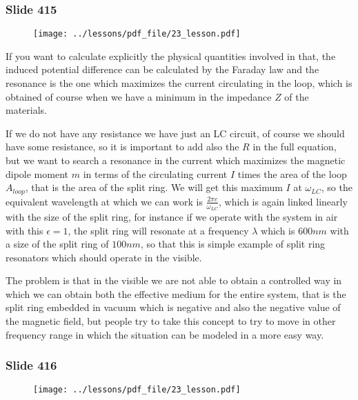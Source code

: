 \documentclass[../main/main.tex]{subfiles}
\begin{document}
\newpage

\subsubsection{Slide 415}

\begin{figure}[h!]
\centering
\texttt{[image: ../lessons/pdf\_file/23\_lesson.pdf]}
\end{figure}

If you want to calculate explicitly the physical quantities involved in that, the induced potential difference can be calculated by the Faraday law and the resonance is the one which maximizes the current circulating in the loop, which is obtained of course when we have a minimum in the impedance $Z$ of the materials.

If we do not have any resistance we have just an LC circuit, of course we should have some resistance, so it is important to add also the $R$ in the full equation, but we want to search a resonance in the current which maximizes the magnetic dipole moment $m$ in terms of the circulating current $I$ times the area of the loop $A_{loop}$, that is the area of the split ring. 
We will get this maximum $I$ at $\omega_{LC}$, so the equivalent wavelength at which we can work is $\frac{2 \pi c}{\omega_{LC}}$, which is again linked linearly with the size of the split ring, for instance if we operate with the system in air with this $\epsilon = 1$, the split ring will resonate at a frequency $\lambda$ which is $600 nm$ with a size of the split ring of $100 nm$, so that this is simple example of split ring resonators which should operate in the visible.

The problem is that in the visible we are not able to obtain a controlled way in which we can obtain both the effective medium for the entire system, that is the split ring embedded in vacuum which is negative and also the negative value of the magnetic field, but people try to take this concept to try to move in other frequency range in which the situation can be modeled in a more easy way.

\newpage

\subsubsection{Slide 416}

\begin{figure}[h!]
\centering
\texttt{[image: ../lessons/pdf\_file/23\_lesson.pdf]}
\end{figure}
\end{document}
